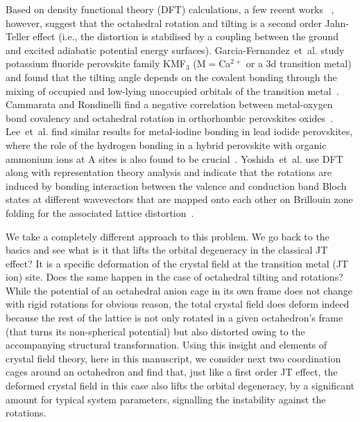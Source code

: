 \documentclass[a4paper,prb,twocolumn]{revtex4-1}  %
\newcommand{\az}[1]{{\color{magenta}{#1}}} %
\begin{document}
Based on density functional theory (DFT) calculations,
a few recent works
~\cite{garcia-fernandezJPCL2010,CammarataJCP2014,nick2016,YoshidaPRL21}, 
however, 
suggest that the octahedral rotation and tilting is 
a second order Jahn-Teller effect
(i.e., the distortion is stabilised by a coupling between the ground and excited adiabatic potential energy surfaces).
Garcia-Fernandez~et~al.
study
potassium fluoride perovskite family KMF$_3$ (M$=$Ca$^{2+}$ or a $3$d transition metal)
and found that the tilting angle
depends on the covalent bonding through the mixing of occupied and 
low-lying unoccupied orbitals of the transition metal~\cite{garcia-fernandezJPCL2010}.
Cammarata and Rondinelli
find a negative correlation between metal-oxygen bond covalency 
and octahedral rotation in orthorhombic perovskites oxides~\cite{CammarataJCP2014}.
Lee~et~al. find 
similar results for metal-iodine bonding in
lead iodide perovskites,
where the role of 
the hydrogen bonding 
in a hybrid perovskite with
organic ammonium ions at A sites
is also found to be crucial~\cite{nick2016}.
Yoshida~et~al.
use DFT along with 
representation theory analysis 
and 
indicate that 
the rotations are induced by bonding interaction 
between the valence and conduction band Bloch states at different wavevectors
that are mapped onto each other on Brillouin zone folding
 for the associated lattice distortion~\cite{YoshidaPRL21}.




We take a completely different approach to this problem.
We go back to the basics
and see 
what is it that lifts 
 the orbital degeneracy in the classical JT effect?
It is a specific 
deformation of the crystal field 
at the transition metal (JT ion) site.
Does the same happen in the case of octahedral tilting and rotations?
While the potential of an octahedral anion cage 
in its own frame
does not change 
with
rigid rotations for obvious reason,
the total crystal field 
does deform indeed
because
 the rest of the lattice is not only rotated
  in a given octahedron's frame (that turns its non-spherical potential)
 but also distorted owing to the accompanying structural transformation.
Using this insight
and elements of crystal field theory,
here in this manuscript,
we 
consider next two coordination cages around an octahedron
and find that,
just like a first order JT effect,
 the deformed crystal field 
in this case also lifts the orbital degeneracy,
by a significant amount for typical system parameters,
signalling the instability against the rotations.
\end{document}
